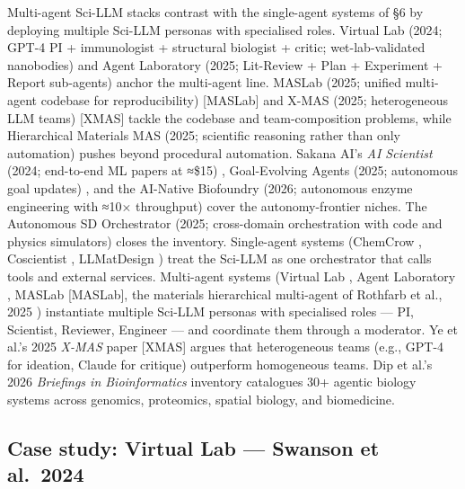 \documentclass{article}
\begin{document}
Multi-agent Sci-LLM stacks contrast with the single-agent systems of §6 by deploying multiple Sci-LLM personas with specialised roles. Virtual Lab (2024; GPT-4 PI + immunologist + structural biologist + critic; wet-lab-validated nanobodies) \cite{swanson2024thevirtuallabaiage} and Agent Laboratory (2025; Lit-Review + Plan + Experiment + Report sub-agents) \cite{schmidgall2025agentlaboratoryusi} anchor the multi-agent line. MASLab (2025; unified multi-agent codebase for reproducibility) {[}MASLab{]} and X-MAS (2025; heterogeneous LLM teams) {[}XMAS{]} tackle the codebase and team-composition problems, while Hierarchical Materials MAS (2025; scientific reasoning rather than only automation) \cite{rothfarb2025hierarchicalmultia} pushes beyond procedural automation. Sakana AI's \emph{AI Scientist} (2024; end-to-end ML papers at ≈\$15) \cite{luo2025llm4srasurveyonlar}, Goal-Evolving Agents (2025; autonomous goal updates) \cite{du2025acceleratingscient}, and the AI-Native Biofoundry (2026; autonomous enzyme engineering with ≈10× throughput) \cite{zhang2026anainativebiofound} cover the autonomy-frontier niches. The Autonomous SD Orchestrator (2025; cross-domain orchestration with code and physics simulators) \cite{zhou2025autonomousagentsfo} closes the inventory. Single-agent systems (ChemCrow \cite{bran2024naturemachineintel}, Coscientist \cite{boiko2023nature6242023}, LLMatDesign \cite{jia2024arxiv2406131632024}) treat the Sci-LLM as one orchestrator that calls tools and external services. Multi-agent systems (Virtual Lab \cite{swanson2024thevirtuallabaiage}, Agent Laboratory \cite{schmidgall2025agentlaboratoryusi}, MASLab {[}MASLab{]}, the materials hierarchical multi-agent of Rothfarb et al., 2025 \cite{rothfarb2025hierarchicalmultia}) instantiate multiple Sci-LLM personas with specialised roles --- PI, Scientist, Reviewer, Engineer --- and coordinate them through a moderator. Ye et al.'s 2025 \emph{X-MAS} paper {[}XMAS{]} argues that heterogeneous teams (e.g., GPT-4 for ideation, Claude for critique) outperform homogeneous teams. Dip et al.'s 2026 \emph{Briefings in Bioinformatics} inventory \cite{dip2026largelanguagemodel} catalogues 30+ agentic biology systems across genomics, proteomics, spatial biology, and biomedicine.

\subsection{Case study: Virtual Lab --- Swanson et al.~2024}\label{case-study-virtual-lab-swanson-et-al.-2024}
\end{document}
